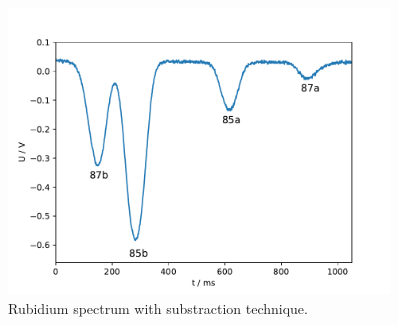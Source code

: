 \begin{figure}
  \centering
  \includegraphics[width=0.9\textwidth]{Pics/Rb_spectrum_subst.pdf}
  \caption{Rubidium spectrum with substraction technique.}
  \label{fig:spectrum_sub}
\end{figure}
